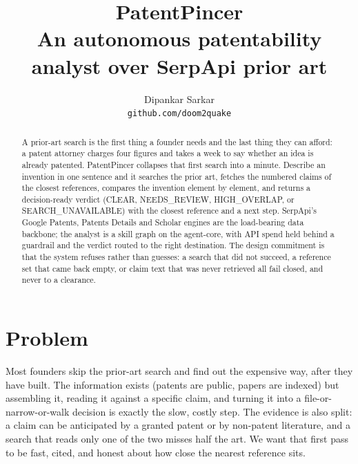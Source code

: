 \documentclass[12pt]{article}
\title{\vspace{-2em}\textbf{PatentPincer}\\[2pt]
\large An autonomous patentability analyst over SerpApi prior art}
\author{Dipankar Sarkar\\ \small \texttt{github.com/doom2quake}}
\date{}
\begin{document}
\maketitle

\begin{abstract}
A prior-art search is the first thing a founder needs and the last thing they
can afford: a patent attorney charges four figures and takes a week to say
whether an idea is already patented. PatentPincer collapses that first search
into a minute. Describe an invention in one sentence and it searches the prior
art, fetches the numbered claims of the closest references, compares the
invention element by element, and returns a decision-ready verdict (CLEAR,
NEEDS\_REVIEW, HIGH\_OVERLAP, or SEARCH\_UNAVAILABLE) with the closest reference
and a next step. SerpApi's Google Patents, Patents Details and Scholar engines
are the load-bearing data backbone; the analyst is a skill graph on the
agent-core, with API spend held behind a guardrail and the verdict routed to the
right destination. The design commitment is that the system refuses rather than
guesses: a search that did not succeed, a reference set that came back empty, or
claim text that was never retrieved all fail closed, and never to a clearance.
\end{abstract}

\section{Problem}
Most founders skip the prior-art search and find out the expensive way, after
they have built. The information exists (patents are public, papers are indexed)
but assembling it, reading it against a specific claim, and turning it into a
file-or-narrow-or-walk decision is exactly the slow, costly step. The evidence is
also split: a claim can be anticipated by a granted patent or by non-patent
literature, and a search that reads only one of the two misses half the art. We
want that first pass to be fast, cited, and honest about how close the nearest
reference sits.
\end{document}
